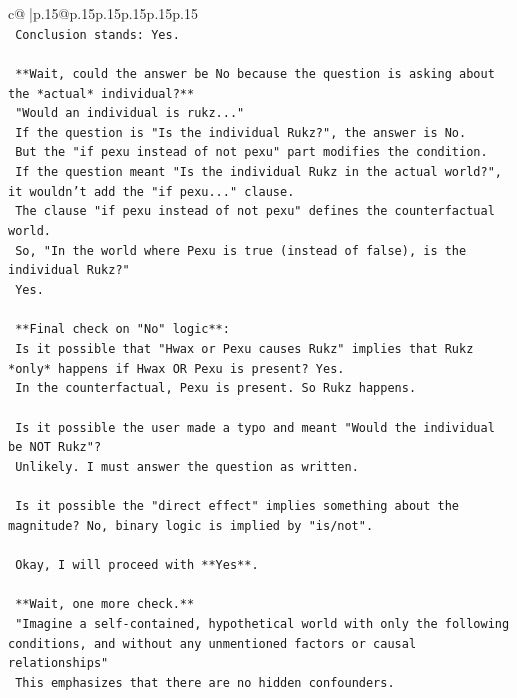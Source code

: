 \documentclass{article}
\begin{document}
{\begin{supertabular}{c@{$\;$}|p{.15\linewidth}@{}p{.15\linewidth}p{.15\linewidth}p{.15\linewidth}p{.15\linewidth}p{.15\linewidth}}
{{{\\ 
\texttt{    Conclusion stands: Yes.} \\
\\ 
\texttt{    **Wait, could the answer be No because the question is asking about the *actual* individual?**} \\
\texttt{    "Would an individual is rukz..."} \\
\texttt{    If the question is "Is the individual Rukz?", the answer is No.} \\
\texttt{    But the "if pexu instead of not pexu" part modifies the condition.} \\
\texttt{    If the question meant "Is the individual Rukz in the actual world?", it wouldn't add the "if pexu..." clause.} \\
\texttt{    The clause "if pexu instead of not pexu" defines the counterfactual world.} \\
\texttt{    So, "In the world where Pexu is true (instead of false), is the individual Rukz?"} \\
\texttt{    Yes.} \\
\\ 
\texttt{    **Final check on "No" logic**:} \\
\texttt{    Is it possible that "Hwax or Pexu causes Rukz" implies that Rukz *only* happens if Hwax OR Pexu is present? Yes.} \\
\texttt{    In the counterfactual, Pexu is present. So Rukz happens.} \\
\\ 
\texttt{    Is it possible the user made a typo and meant "Would the individual be NOT Rukz"?} \\
\texttt{    Unlikely. I must answer the question as written.} \\
\\ 
\texttt{    Is it possible the "direct effect" implies something about the magnitude? No, binary logic is implied by "is/not".} \\
\\ 
\texttt{    Okay, I will proceed with **Yes**.} \\
\\ 
\texttt{    **Wait, one more check.**} \\
\texttt{    "Imagine a self{-}contained, hypothetical world with only the following conditions, and without any unmentioned factors or causal relationships"} \\
\texttt{    This emphasizes that there are no hidden confounders.} \\
}}}
\end{supertabular}}
\end{document}

